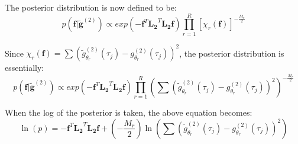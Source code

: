 \documentclass[11pt]{article}
\begin{document}
The posterior distribution is now defined to be:
\begin{equation}
p(\mathbf{f}|\tilde{\mathbf{g}}^{(2)}) \propto exp\left( -\mathbf{f}^T\mathbf{L_2}^T \mathbf{L_2}\mathbf{f}\right) \prod_{r=1}^{R} {\left[\chi_r(\mathbf{f})\right]}^{-\frac{M_r}{2}}
\end{equation}

Since $\chi_r(\mathbf{f}) = \sum {\left( \tilde{g}^{(2)}_{\theta_r} (\tau_j) - g^{(2)}_{\theta_r}(\tau_j) \right)}^2$, the posterior distribution is essentially:
\begin{equation}
p(\mathbf{f}|\tilde{\mathbf{g}}^{(2)}) \propto exp\left( -\mathbf{f}^T\mathbf{L_2}^T \mathbf{L_2}\mathbf{f}\right) \prod_{r=1}^{R} {\left( \sum{(\tilde{g}^{(2)}_{\theta_r} (\tau_j) - g^{(2)}_{\theta_r}(\tau_j) )}^2 \right)}^{-\frac{M_r}{2}}
\end{equation}

When the log of the posterior is taken, the above equation becomes:
\begin{equation}
\ln(p) = -\mathbf{f}^T\mathbf{L_2}^T \mathbf{L_2}\mathbf{f} + \left(-\frac{M_r}{2} \right) \ln \left(\sum {\left( \tilde{g}^{(2)}_{\theta_r} (\tau_j) - g^{(2)}_{\theta_r} (\tau_j) \right)}^2 \right)
\end{equation}
\end{document}
